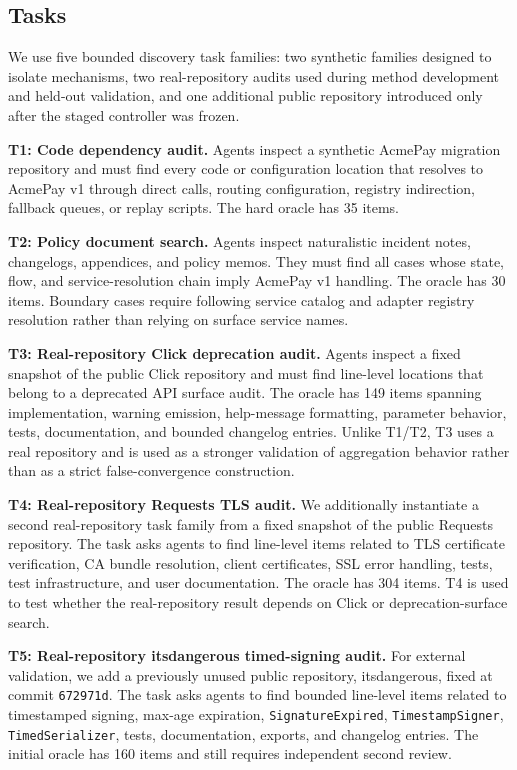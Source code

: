 \documentclass[letterpaper]{article}
\begin{document}
\subsection{Tasks}

We use five bounded discovery task families: two synthetic families designed to
isolate mechanisms, two real-repository audits used during method development
and held-out validation, and one additional public repository introduced only
after the staged controller was frozen.

\textbf{T1: Code dependency audit.} Agents inspect a synthetic AcmePay migration
repository and must find every code or configuration location that resolves to
AcmePay v1 through direct calls, routing configuration, registry indirection,
fallback queues, or replay scripts. The hard oracle has 35 items.

\textbf{T2: Policy document search.} Agents inspect naturalistic incident notes,
changelogs, appendices, and policy memos. They must find all cases whose state,
flow, and service-resolution chain imply AcmePay v1 handling. The oracle has 30
items. Boundary cases require following service catalog and adapter registry
resolution rather than relying on surface service names.

\textbf{T3: Real-repository Click deprecation audit.} Agents inspect a fixed
snapshot of the public Click repository and must find line-level locations that
belong to a deprecated API surface audit. The oracle has 149 items spanning
implementation, warning emission, help-message formatting, parameter behavior,
tests, documentation, and bounded changelog entries. Unlike T1/T2, T3 uses a
real repository and is used as a stronger validation of aggregation behavior
rather than as a strict false-convergence construction.

\textbf{T4: Real-repository Requests TLS audit.} We additionally instantiate a
second real-repository task family from a fixed snapshot of the public Requests
repository. The task asks agents to find line-level items related to TLS
certificate verification, CA bundle resolution, client certificates, SSL error
handling, tests, test infrastructure, and user documentation. The oracle has
304 items. T4 is used to test whether the real-repository result depends on
Click or deprecation-surface search.

\textbf{T5: Real-repository itsdangerous timed-signing audit.} For external
validation, we add a previously unused public repository, itsdangerous, fixed at
commit \texttt{672971d}. The task asks agents to find bounded line-level items
related to timestamped signing, max-age expiration, \texttt{SignatureExpired},
\texttt{TimestampSigner}, \texttt{TimedSerializer}, tests, documentation,
exports, and changelog entries. The initial oracle has 160 items and still
requires independent second review.
\end{document}
